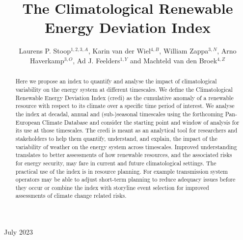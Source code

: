 \documentclass[12pt]{iopart}
\newcommand{\credi}[0]{{\sc credi}}
\begin{document}
\title[The Climatological Renewable Energy Deviation Index]{The Climatological Renewable Energy Deviation Index}

\author{Laurens P. Stoop$^{1,2,3,A}$, Karin van der Wiel$^{4,B}$, William Zappa$^{3,N}$, Arno Haverkamp$^{3,O}$, Ad J. Feelders$^{1,Y}$ and Machteld van den Broek$^{4,Z}$}

\address{$^1$ Information and Computing Science, Utrecht University, the Netherlands}
\address{$^2$ Copernicus Institute of Sustainable Development, Utrecht University, the Netherlands}
\address{$^3$ TenneT TSO B.V., Arnhem, the Netherlands}
\address{$^4$ Royal Netherlands Meteorological Institute (KNMI), the Netherlands}
\address{$^5$ Integrated Research on Energy, Environment and Society, Energy and Sustainability Research Institute Groningen (ESRIG), University of Groningen, the Netherlands}


\vspace{10pt}
\begin{indented}
\item[]July 2023
\end{indented}


\begin{abstract}
Here we propose an index to quantify and analyse the impact of climatological variability on the energy system at different timescales.
We define the Climatological Renewable Energy Deviation Index (\credi) as the cumulative anomaly of a renewable resource with respect to its climate over a specific time period of interest.
We analyse the index at decadal, annual and (sub-)seasonal timescales using the forthcoming Pan-European Climate Database and consider the starting point and window of analysis for its use at those timescales.
The \credi{} is meant as an analytical tool for researchers and stakeholders to help them quantify, understand, and explain, the impact of the variability of weather on the energy system across timescales. 
Improved understanding translates to better assessments of how renewable resources, and the associated risks for energy security, may fare in current and future climatological settings.
The practical use of the index is in resource planning. 
For example transmission system operators may be able to adjust short-term planning to reduce adequacy issues before they occur or combine the index with storyline event selection for improved assessments of climate change related risks.
\end{abstract}
\end{document}
